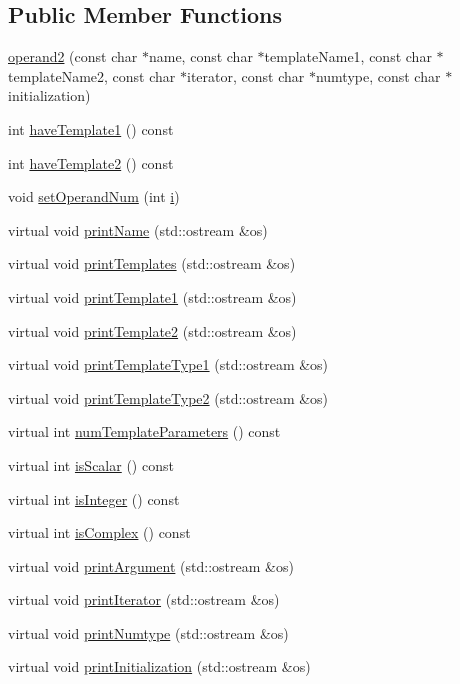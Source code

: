 \subsection*{Public Member Functions}
\begin{DoxyCompactItemize}
\item 
\hyperlink{classoperand2_a189def6bb5a8b4f5e9a32a12d0b3b59d}{operand2} (const char $\ast$name, const char $\ast$template\+Name1, const char $\ast$template\+Name2, const char $\ast$iterator, const char $\ast$numtype, const char $\ast$initialization)
\item 
int \hyperlink{classoperand2_a3b0e2f40bc65dd88e70bdedddf9511cb}{have\+Template1} () const 
\item 
int \hyperlink{classoperand2_a75e4883c39d63207eba0a24341587e83}{have\+Template2} () const 
\item 
void \hyperlink{classoperand2_a1ea27dabad69c5e698dabd196140fb26}{set\+Operand\+Num} (int \hyperlink{indexexpr_8h_aabd77643995707c185e95c8cb2782c81}{i})
\item 
virtual void \hyperlink{classoperand2_aed326aa460ecc8a9e70277e02627dfb3}{print\+Name} (std\+::ostream \&os)
\item 
virtual void \hyperlink{classoperand2_a1b042841442155588d46f085fc9da31e}{print\+Templates} (std\+::ostream \&os)
\item 
virtual void \hyperlink{classoperand2_a70007accf94be1faf750625f2af990d8}{print\+Template1} (std\+::ostream \&os)
\item 
virtual void \hyperlink{classoperand2_ad09badbe45aa3b56c3ef917fafc04e57}{print\+Template2} (std\+::ostream \&os)
\item 
virtual void \hyperlink{classoperand2_a280575a59fcd799bb543b657fd343a22}{print\+Template\+Type1} (std\+::ostream \&os)
\item 
virtual void \hyperlink{classoperand2_af07cfaed4e774a4f7bb9751b1cd18c74}{print\+Template\+Type2} (std\+::ostream \&os)
\item 
virtual int \hyperlink{classoperand2_ac0d8ce98517bd1678137ef58014c59d1}{num\+Template\+Parameters} () const 
\item 
virtual int \hyperlink{classoperand2_a34cf561484d6f80ba597f9ca9733ba4f}{is\+Scalar} () const 
\item 
virtual int \hyperlink{classoperand2_a7e001e816f943f131bd907f4d761100f}{is\+Integer} () const 
\item 
virtual int \hyperlink{classoperand2_a3d3ce37584cfb194a696cd1a8c967959}{is\+Complex} () const 
\item 
virtual void \hyperlink{classoperand2_a1e543af4d5b0d04734307cf3daa42fbb}{print\+Argument} (std\+::ostream \&os)
\item 
virtual void \hyperlink{classoperand2_a07320a8711b6d6299287fb161ae7de69}{print\+Iterator} (std\+::ostream \&os)
\item 
virtual void \hyperlink{classoperand2_a015087f4a02e9b3b878bf12d255cbd34}{print\+Numtype} (std\+::ostream \&os)
\item 
virtual void \hyperlink{classoperand2_a3d68b052e71c03b98a3450367ef0227c}{print\+Initialization} (std\+::ostream \&os)
\end{DoxyCompactItemize}
